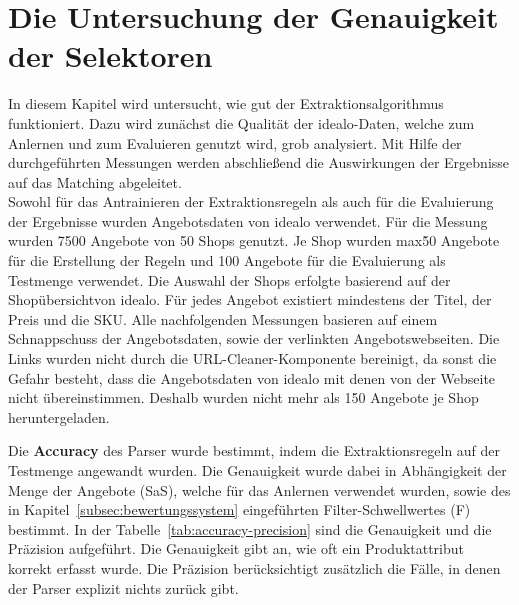\section{Die Untersuchung der Genauigkeit der Selektoren}
\label{sec:evaluierung}

In diesem Kapitel wird untersucht, wie gut der Extraktionsalgorithmus funktioniert.
Dazu wird zunächst die Qualität der idealo-Daten, welche zum Anlernen und zum Evaluieren genutzt wird, grob analysiert.
Mit Hilfe der durchgeführten Messungen werden abschließend die Auswirkungen der Ergebnisse auf das Matching
abgeleitet.\\
\newline
Sowohl für das Antrainieren der Extraktionsregeln als auch für die Evaluierung der Ergebnisse wurden Angebotsdaten
von idealo verwendet.
Für die Messung wurden 7500 Angebote von 50 Shops genutzt.
Je Shop wurden max\. 50 Angebote für die Erstellung der Regeln und 100 Angebote für die Evaluierung als Testmenge
verwendet.
Die Auswahl der Shops erfolgte basierend auf der Shopübersicht\footnotemark von idealo.
Für jedes Angebot existiert mindestens der Titel, der Preis und die SKU.
Alle nachfolgenden Messungen basieren auf einem Schnappschuss der Angebotsdaten, sowie der verlinkten Angebotswebseiten.
Die Links wurden nicht durch die URL-Cleaner-Komponente bereinigt, da sonst die Gefahr besteht, dass die
Angebotsdaten von idealo mit denen von der Webseite nicht übereinstimmen.
Deshalb wurden nicht mehr als 150 Angebote je Shop heruntergeladen.

Die \textbf{Accuracy} des Parser wurde bestimmt, indem die Extraktionsregeln auf der Testmenge angewandt wurden.
Die Genauigkeit wurde dabei in Abhängigkeit der Menge der Angebote (SaS), welche für das Anlernen verwendet wurden,
sowie des in Kapitel~\ref{subsec:bewertungssystem} eingeführten Filter-Schwellwertes (F) bestimmt.
In der Tabelle~\ref{tab:accuracy-precision} sind die Genauigkeit und die Präzision aufgeführt.
Die Genauigkeit gibt an, wie oft ein Produktattribut korrekt erfasst wurde.
Die Präzision berücksichtigt zusätzlich die Fälle, in denen der Parser explizit nichts zurück gibt.

